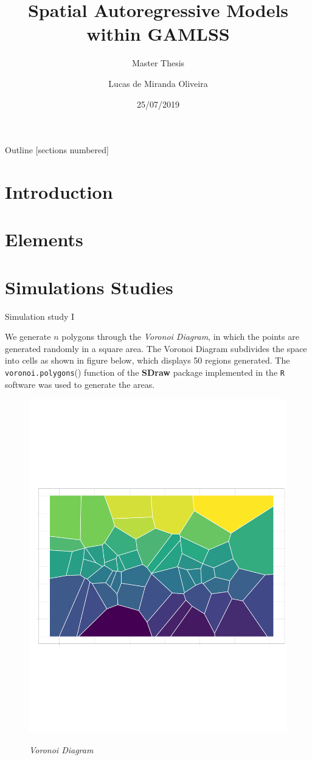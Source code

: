 \documentclass[10pt,unknownkeysallowed]{beamer}
\title{Spatial Autoregressive Models within GAMLSS}
\subtitle{Master Thesis}
\date{25/07/2019}
\author{Lucas de Miranda Oliveira}
\institute{UFPE}
\begin{document}
\maketitle

\begin{frame}{Outline}
  [sections numbered]
  \tableofcontents[hideallsubsections]
\end{frame}

\section{Introduction}


\section{Elements}
\section{Simulations Studies}


\begin{frame}{Simulation study I}

We generate $n$ polygons through the \textit{Voronoi Diagram}, in which the points are generated randomly in a square area. The Voronoi Diagram subdivides the space into cells as shown in figure below, which displays 50 regions generated. The \texttt{voronoi.polygons}() function of the \textbf{SDraw} package implemented in the \texttt{R} software was used to generate the areas.
\vspace{-2.5cm}
 \begin{figure}
\includegraphics[width=0.7\linewidth]{VoroniDiagrams.pdf}
\label{fig:Voronoi Partition}
\caption{\textit{Voronoi Diagram}}
\end{figure}
\end{frame}
\end{document}
